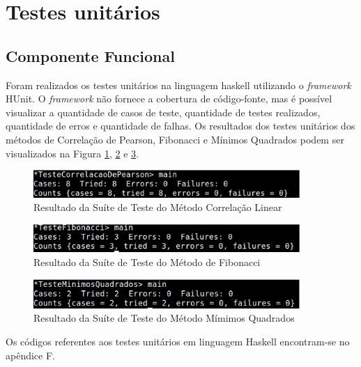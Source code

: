 \section{Testes unitários}

\subsection{Componente Funcional}

Foram realizados os testes unitários na linguagem haskell utilizando o \textit{framework} HUnit. O \textit{framework} não fornece a cobertura de código-fonte, mas é possível visualizar a quantidade de casos de teste, quantidade de testes realizados, quantidade de erros e quantidade de falhas. Os resultados dos testes unitários dos métodos de Correlação de Pearson, Fibonacci e Mínimos Quadrados podem ser visualizados na Figura \ref{testeCorrelacaoHaskell}, \ref{testeFibonacciHaskell} e \ref{TesteMinimosHaskell}.

\begin{figure}[H]
\centering
\includegraphics[width=0.9\textwidth]{figuras/testeCorrelacaoHaskell}
\caption{Resultado da Suíte de Teste do Método Correlação Linear}
\label{testeCorrelacaoHaskell}
\end{figure}

\begin{figure}[H]
\centering
\includegraphics[width=0.9\textwidth]{figuras/testeFibonacciHaskell}
\caption{Resultado da Suíte de Teste do Método de Fibonacci}
\label{testeFibonacciHaskell}
\end{figure}

\begin{figure}[H]
\centering
\includegraphics[width=0.9\textwidth]{figuras/TesteMinimosHaskell}
\caption{Resultado da Suíte de Teste do Método Mímimos Quadrados}
\label{TesteMinimosHaskell}
\end{figure}

Os códigos referentes aos testes unitários em linguagem Haskell encontram-se no apêndice F.

